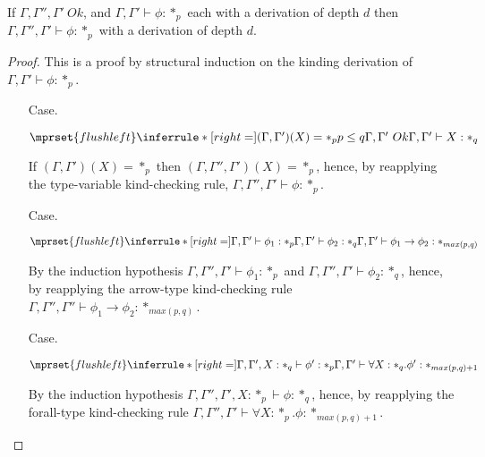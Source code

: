 \begin{lemma}
  If $\Gamma,\Gamma'',\Gamma'\ Ok$, and $\Gamma,\Gamma' \vdash \phi:*_p$ each with a 
  derivation of depth $d$ then $\Gamma,\Gamma'',\Gamma' \vdash \phi:*_p$ with a 
  derivation of depth $d$.
  \label{lemma:context_weakening_for_kinding_ssf}
\end{lemma}
\begin{proof}
  This is a proof by structural induction on the kinding derivation of 
$\Gamma,\Gamma' \vdash \phi:*_p$.
\begin{itemize}
\item[Case.]\ \\
  \begin{center}
    \begin{math}
      $$\mprset{flushleft}
      \inferrule* [right=] {
        (\Gamma,\Gamma')(X) = *_p
	\\
	p \leq q
	\\
	\Gamma,\Gamma'\ Ok
      }{\Gamma,\Gamma' \vdash X : *_q}
    \end{math}
  \end{center}
  If $(\Gamma,\Gamma')(X) = *_p$ then $(\Gamma,\Gamma'',\Gamma')(X) = *_p$, hence, by 
  reapplying the type-variable kind-checking rule, $\Gamma,\Gamma'',\Gamma' \vdash \phi:*_p$.
\item[Case.]\ \\
  \begin{center}
    \begin{math}
      $$\mprset{flushleft}
      \inferrule* [right=] {
        \Gamma,\Gamma' \vdash \phi_1 : *_p
	\\
	\Gamma,\Gamma' \vdash \phi_2 : *_q
      }{\Gamma,\Gamma' \vdash \phi_1 \rightarrow \phi_2 : *_{max(p,q)}}
    \end{math}
  \end{center}
  By the induction hypothesis $\Gamma,\Gamma'',\Gamma' \vdash \phi_1:*_p$ and 
  $\Gamma,\Gamma'',\Gamma' \vdash \phi_2:*_q$,
  hence, by reapplying the arrow-type kind-checking rule 
  $\Gamma,\Gamma'',\Gamma'' \vdash \phi_1 \rightarrow \phi_2:*_{max(p,q)}$.

\item[Case.]\ \\
  \begin{center}
    \begin{math}
      $$\mprset{flushleft}
      \inferrule* [right=] {
        \Gamma,\Gamma',X : *_q \vdash \phi' : *_p
      }{\Gamma,\Gamma' \vdash \forall X:*_q.\phi' : *_{max(p,q)+1}}
    \end{math}
  \end{center}
  By the induction hypothesis $\Gamma,\Gamma'',\Gamma',X:*_p \vdash \phi:*_q$, hence, by 
  reapplying the forall-type
  kind-checking rule $\Gamma,\Gamma'',\Gamma' \vdash \forall X:*_p.\phi:*_{max(p,q)+1}$.
\end{itemize}
\end{proof}

